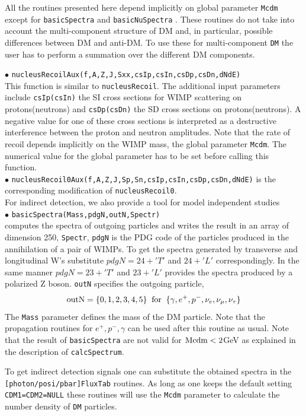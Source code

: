 \documentclass[12pt,a4paper]{article}
\begin{document}
{All the routines presented here 
depend implicitly on  global parameter {\tt Mcdm} except for {\tt basicSpectra} and {\tt basicNuSpectra} . These routines do not   take
into account the multi-component structure of DM and, in particular, possible   
differences between DM and anti-DM.   To use  these 
for multi-component {\tt DM} the user has to perform a summation over the different DM components. 
   
\noindent
$\bullet$ \verb|nucleusRecoilAux(f,A,Z,J,Sxx,csIp,csIn,csDp,csDn,dNdE)|\\
This function is similar to \verb|nucleusRecoil|. 
The additional input parameters include \verb|csIp(csIn)| the SI cross 
sections for WIMP scattering on protons(neutrons) and
\verb|csDp(csDn)| the SD cross sections on protons(neutrons). 
A negative value for one of these cross sections is interpreted as a destructive 
interference between the
proton and neutron amplitudes. Note that the rate of recoil  depends 
implicitly on the WIMP mass, the  global parameter \verb|Mcdm|.
 The numerical value for the global parameter has to be
set before calling this function.\\
\noindent
$\bullet$ \verb|nucleusRecoil0Aux(f,A,Z,J,Sp,Sn,csIp,csIn,csDp,csDn,dNdE)|
is the corresponding modification of \verb|nucleusRecoil0|.\\

For indirect detection, we also provide a tool for model independent studies\\ 
\noindent
$\bullet$ \verb|basicSpectra(Mass,pdgN,outN,Spectr)|\\
computes the spectra of outgoing particles and writes the result in an array of dimension 250, \verb|Spectr|,
\verb|pdgN| is the PDG code of the particles produced in the annihilation of a pair of 
WIMPs. To get the spectra generated by transverse and longitudinal W's substitute 
$ pdgN=24+'T'$ and $24+'L'$ correspondingly. In the same manner $pdgN=23+'T'$ and
$23+'L'$  provides the spectra produced by a polarized Z boson.
 \verb|outN|  specifies the outgoing particle,
$$ {\rm outN} = \{0,1,2,3,4,5\} \;\; {\rm for}\;\; \{\gamma,   e^+,  p^-, \nu_e,
\nu_{\mu},\nu_{\tau}\} $$
The {\tt Mass} parameter defines the mass of the DM particle.
Note that the  propagation routines for $e^+,p^-,\gamma$ can be used after 
this routine as usual. Note that the result of {\tt basicSpectra}
are not valid for ${\rm Mcdm} < 2$GeV as explained in the description of {\tt calcSpectrum}.  

To get indirect detection signals one can substitute the obtained spectra in the\\ 
{\tt [photon/posi/pbar]FluxTab} routines. As long as one keeps the default setting  {\tt CDM1=CDM2=NULL} these routines will use the {\tt Mcdm} parameter to calculate the number density of {\tt DM} particles. 
  

}
\end{document}
